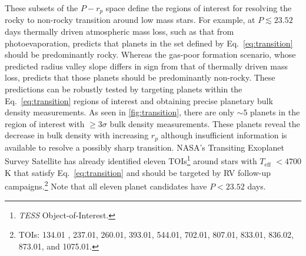 \documentclass[twocolumn]{emulateapj}
\newcommand{\tess}[1]{\emph{TESS}#1}
\newcommand{\teff}[1]{$T_{\text{eff}}$#1}
\begin{document}
\noindent These subsets of the $P-r_p$ space define the regions of interest for resolving the
  rocky to non-rocky transition around low mass stars. For example, at $P\lesssim 23.52$ days thermally driven
  atmospheric mass loss, such as that from photoevaporation, predicts that planets in the set defined by
  Eq.~\ref{eq:transition} should be predominantly rocky. Whereas the gas-poor formation scenario, whose predicted
  radius valley slope differs in sign from that of thermally driven mass loss, predicts that those planets should be
  predominantly non-rocky. These predictions can be robustly tested by targeting planets within the
  Eq.~\ref{eq:transition} regions of interest and obtaining precise planetary bulk density measurements.
  As seen in \autoref{fig:transition}, there are only $\sim 5$ planets in the region of interest with $\geq 3\sigma$ bulk
  density measurements. These planets reveal the decrease in bulk density with increasing $r_p$ although insufficient
  information is available to resolve a possibly sharp transition.
  NASA's Transiting Exoplanet Survey Satellite \citep[\tess{;}][]{ricker15} has already identified eleven
  TOIs\footnote{\tess{} Object-of-Interest.}
  around stars with \teff{} $<4700$ K that satisfy Eq.~\ref{eq:transition} and should be targeted by RV
  follow-up campaigns.\footnote{TOIs: 134.01 \citep{astudillodefru19}, 237.01, 260.01, 393.01, 544.01, 702.01, 807.01, 833.01,
    836.02, 873.01, and 1075.01.} Note that all eleven planet candidates have $P<23.52$ days.
\end{document}
